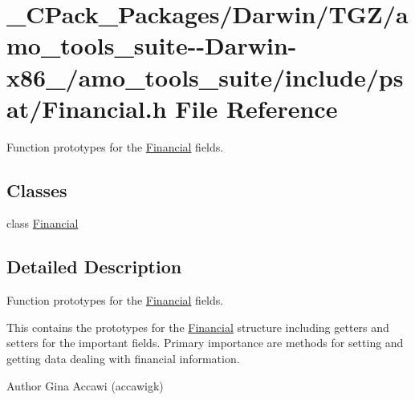 \hypertarget{___c_pack___packages_2_darwin_2_t_g_z_2amo__tools__suite--_darwin-x86__64_2amo__tools__suite_2include_2psat_2_financial_8h}{}\section{\+\_\+\+C\+Pack\+\_\+\+Packages/\+Darwin/\+T\+G\+Z/amo\+\_\+tools\+\_\+suite-\/-\/\+Darwin-\/x86\+\_/amo\+\_\+tools\+\_\+suite/include/psat/\+Financial.h File Reference}
\label{___c_pack___packages_2_darwin_2_t_g_z_2amo__tools__suite--_darwin-x86__64_2amo__tools__suite_2include_2psat_2_financial_8h}


Function prototypes for the \hyperlink{class_financial}{Financial} fields.  


\subsection*{Classes}
\begin{DoxyCompactItemize}
\item 
class \hyperlink{class_financial}{Financial}
\end{DoxyCompactItemize}


\subsection{Detailed Description}
Function prototypes for the \hyperlink{class_financial}{Financial} fields. 

This contains the prototypes for the \hyperlink{class_financial}{Financial} structure including getters and setters for the important fields. Primary importance are methods for setting and getting data dealing with financial information.

\begin{DoxyAuthor}{Author}
Gina Accawi (accawigk) 
\end{DoxyAuthor}
